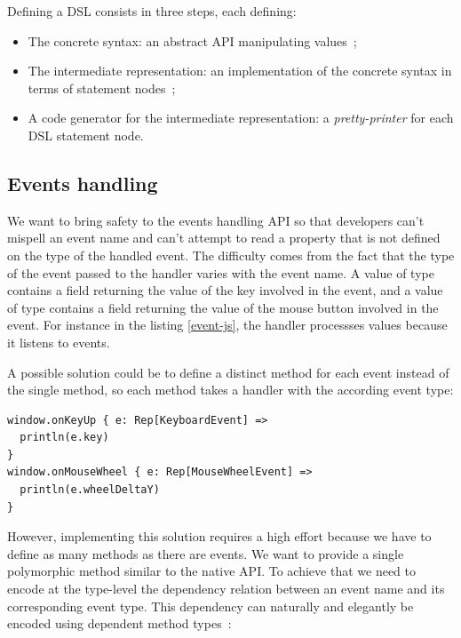 \documentclass[american,english,runningheads]{llncs}
\begin{document}
Defining a DSL consists in three steps, each defining:

\begin{itemize}
\item The concrete syntax: an abstract API manipulating  values~;
\item The intermediate representation: an implementation of the concrete syntax in terms of statement nodes~;
\item A code generator for the intermediate representation: a \emph{pretty-printer} for each DSL statement node.
\end{itemize}

\subsection{Events handling}

We want to bring safety to the events handling API so that developers can’t mispell an event name and can’t attempt to read a property that is not defined on the type of the handled event. The difficulty comes from the fact that the type of the event passed to the handler varies with the event name. A value of type  contains a  field returning the value of the key involved in the event, and a value of type  contains a  field returning the value of the mouse button involved in the event. For instance in the listing \ref{event-js}, the handler processses  values because it listens to  events.

A possible solution could be to define a distinct method for each event instead of the single  method, so each method takes a handler with the according event type:

\begin{lstlisting}
window.onKeyUp { e: Rep[KeyboardEvent] =>
  println(e.key)
}
window.onMouseWheel { e: Rep[MouseWheelEvent] =>
  println(e.wheelDeltaY)
}
\end{lstlisting}

However, implementing this solution requires a high effort because we have to define as many methods as there are events. We want to provide a single polymorphic method similar to the native API. To achieve that we need to encode at the type-level the dependency relation between an event name and its corresponding event type. This dependency can naturally and elegantly be encoded using dependent method types~\cite{Oliveira10_Typeclasses}:
\end{document}
